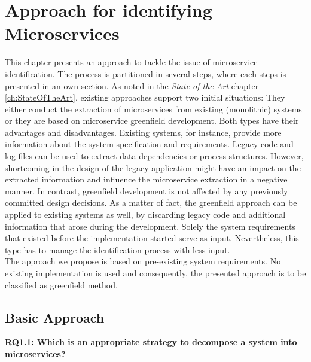 \chapter{Approach for identifying Microservices}
\label{ch:Solution}
This chapter presents an approach to tackle the issue of microservice identification. The process is partitioned in several steps, where each steps is presented in an own section.
As noted in the \textit{State of the Art} chapter \ref{ch:StateOfTheArt}, existing approaches support two initial situations: They either conduct the extraction of microservices from existing (monolithic) systems or they are based on microservice greenfield development. Both types have their advantages and disadvantages. Existing systems, for instance, provide more information about the system specification and requirements. Legacy code and log files can be used to extract data dependencies or process structures. However, shortcoming in the design of the legacy application might have an impact on the extracted information and influence the microservice extraction in a negative manner. In contrast, greenfield development is not affected by any previously committed design decisions. As a matter of fact, the greenfield approach can be applied to existing systems as well, by discarding legacy code and additional information that arose during the development. Solely the system requirements that existed before the implementation started serve as input. Nevertheless, this type has to manage the identification process with less input.\\
The approach we propose is based on pre-existing system requirements. No existing implementation is used and consequently, the presented approach is to be classified as greenfield method.\\



\section{Basic Approach}


\vspace{0.5cm}
\par
\begingroup
\leftskip=1cm
\rightskip=1cm

\noindent
\textbf{RQ1.1: Which is an appropriate strategy to decompose a system into microservices? }

\endgroup
\vspace{0.5cm}



